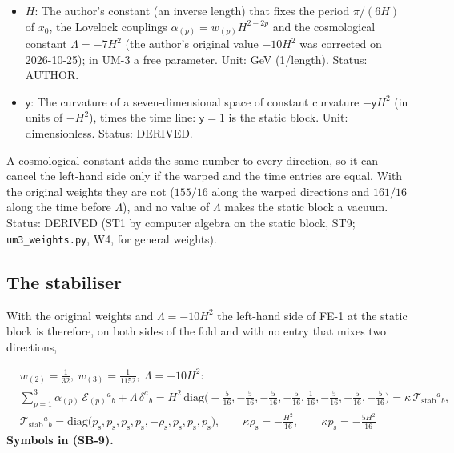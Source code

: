 \documentclass[
  10pt,
]{article}
\begin{document}
\begin{itemize}
  gravitons \(\sqrt5\) times faster than light; they were corrected at
  the author's order of 2026-10-25. Unit: dimensionless. Value:
  \((1, 1/20, 1/360)\); the author's original \((1, 1/32, 1/1152)\).
  Status: AUTHOR (the form), ASSUMED (the criterion of the correction),
  DERIVED (the unique values that meet it).
\item
  \(H\): The author's constant (an inverse length) that fixes the period
  \(\pi/(6H)\) of \(x_0\), the Lovelock couplings
  \(\alpha_{(p)} = w_{(p)}H^{2-2p}\) and the cosmological constant
  \(\Lambda = -7H^2\) (the author's original value \(-10H^2\) was
  corrected on 2026-10-25); in UM-3 a free parameter. Unit: GeV
  (1/length). Status: AUTHOR.
\item
  \(\mathsf{y}\): The curvature of a seven-dimensional space of constant
  curvature \(-\mathsf{y}H^2\) (in units of \(-H^2\)), times the time
  line: \(\mathsf{y} = 1\) is the static block. Unit: dimensionless.
  Status: DERIVED.
\end{itemize}

A cosmological constant adds the same number to every direction, so it
can cancel the left-hand side only if the warped and the time entries
are equal. With the original weights they are not (\(155/16\) along the
warped directions and \(161/16\) along the time before \(\Lambda\)), and
no value of \(\Lambda\) makes the static block a vacuum. Status: DERIVED
(ST1 by computer algebra on the static block, ST9;
\texttt{um3\_weights.py}, W4, for general weights).

\hypertarget{the-stabiliser}{%
\subsection{The stabiliser}\label{the-stabiliser}}

With the original weights and \(\Lambda = -10H^2\) the left-hand side of
FE-1 at the static block is therefore, on both sides of the fold and
with no entry that mixes two directions,

\[
\begin{aligned}
&w_{(2)} = \frac{1}{32},\ w_{(3)} = \frac{1}{1152},\ \Lambda = -10H^2:\\
&\sum_{p=1}^{3}\alpha_{(p)}\,\mathcal{E}_{(p)}{}^a{}_b + \Lambda\,\delta^a{}_b = H^2\,\mathrm{diag}\Big(-\frac{5}{16}, -\frac{5}{16}, -\frac{5}{16},
 -\frac{5}{16}, \frac{1}{16}, -\frac{5}{16}, -\frac{5}{16}, -\frac{5}{16}\Big) = \kappa\,\mathcal{T}_{\mathrm{stab}}{}^a{}_b,\\
&\mathcal{T}_{\mathrm{stab}}{}^a{}_b = \mathrm{diag}\big(p_{\mathrm{s}}, p_{\mathrm{s}}, p_{\mathrm{s}}, p_{\mathrm{s}},
 -\rho_{\mathrm{s}}, p_{\mathrm{s}}, p_{\mathrm{s}}, p_{\mathrm{s}}\big),\qquad
 \kappa\rho_{\mathrm{s}} = -\frac{H^2}{16},\qquad \kappa p_{\mathrm{s}} = -\frac{5H^2}{16}
\end{aligned} \tag{SB-9}
\] \textbf{Symbols in (SB-9).}
\end{document}
